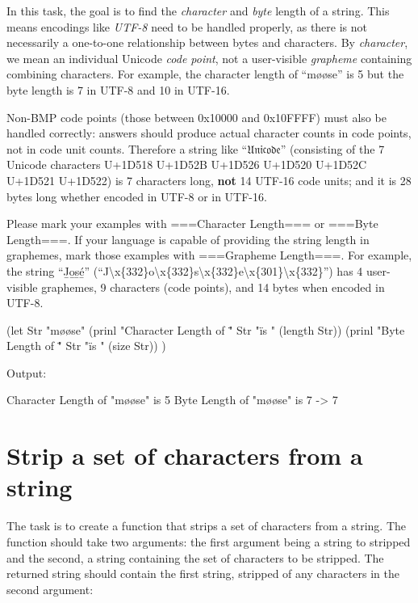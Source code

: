 In this task, the goal is to find the \emph{character} and \emph{byte}
length of a string. This means encodings like \emph{UTF-8}
need to be handled properly, as there is not necessarily a one-to-one
relationship between bytes and characters. By \emph{character}, we mean
an individual Unicode \emph{code point}, not a user-visible
\emph{grapheme} containing combining characters. For example, the
character length of ``møøse'' is 5 but the byte length is 7 in UTF-8 and
10 in UTF-16.

Non-BMP code points (those between 0x10000 and 0x10FFFF) must also be
handled correctly: answers should produce actual character counts in
code points, not in code unit counts. Therefore a string like
``𝔘𝔫𝔦𝔠𝔬𝔡𝔢'' (consisting of the 7 Unicode characters U+1D518 U+1D52B
U+1D526 U+1D520 U+1D52C U+1D521 U+1D522) is 7 characters long,
\textbf{not} 14 UTF-16 code units; and it is 28 bytes long whether
encoded in UTF-8 or in UTF-16.

Please mark your examples with ===Character Length=== or ===Byte
Length===. If your language is capable of providing the string length in
graphemes, mark those examples with ===Grapheme Length===. For example,
the string ``J̲o̲s̲é̲''
(``J\textbackslash{}x\{332\}o\textbackslash{}x\{332\}s\textbackslash{}x\{332\}e\textbackslash{}x\{301\}\textbackslash{}x\{332\}'')
has 4 user-visible graphemes, 9 characters (code points), and 14 bytes
when encoded in UTF-8.



\begin{wideverbatim}

(let Str "møøse"
   (prinl "Character Length of \"" Str "\" is " (length Str))
   (prinl "Byte Length of \"" Str "\" is " (size Str)) )

Output:

Character Length of "møøse" is 5
Byte Length of "møøse" is 7
-> 7

\end{wideverbatim}

\pagebreak{}
\section*{Strip a set of characters from a string}

The task is to create a function that strips a set of characters from a
string. The function should take two arguments: the first argument being
a string to stripped and the second, a string containing the set of
characters to be stripped. The returned string should contain the first
string, stripped of any characters in the second argument:

